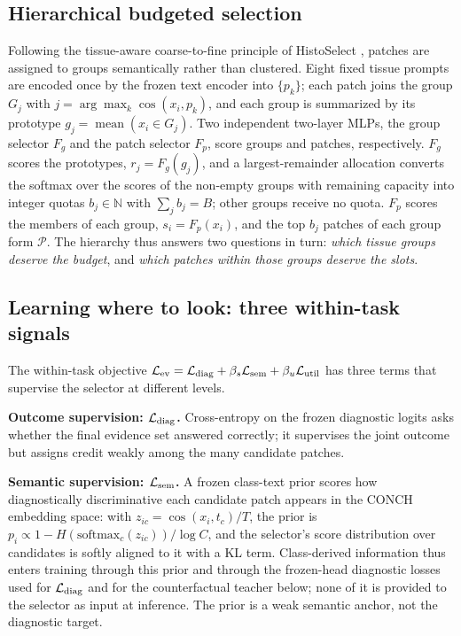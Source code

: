 \documentclass{article}
\def\L{{\cal L}}
\newcommand{\Fg}{F_g}
\newcommand{\Fp}{F_p}
\newcommand{\Psel}{\mathcal{P}}
\begin{document}
\subsection{Hierarchical budgeted selection}
\label{ssec:hier}

Following the tissue-aware coarse-to-fine principle of HistoSelect \cite{huang2026histoselect}, patches are assigned to groups semantically rather than clustered. Eight fixed tissue prompts are encoded once by the frozen text encoder into $\{p_k\}$; each patch joins the group $G_j$ with $j=\arg\max_k\cos(x_i,p_k)$, and each group is summarized by its prototype $g_j=\operatorname{mean}(x_i\in G_j)$. Two independent two-layer MLPs, the group selector $\Fg$ and the patch selector $\Fp$, score groups and patches, respectively. $\Fg$ scores the prototypes, $r_j=\Fg(g_j)$, and a largest-remainder allocation converts the softmax over the scores of the non-empty groups with remaining capacity into integer quotas $b_j\in\mathbb{N}$ with $\sum_j b_j=B$; other groups receive no quota. $\Fp$ scores the members of each group, $s_i=\Fp(x_i)$, and the top $b_j$ patches of each group form $\Psel$. The hierarchy thus answers two questions in turn: \emph{which tissue groups deserve the budget}, and \emph{which patches within those groups deserve the slots}.

\subsection{Learning where to look: three within-task signals}
\label{ssec:within}

The within-task objective $\L_{\mathrm{ev}}=\L_{\mathrm{diag}}+\beta_s\L_{\mathrm{sem}}+\beta_u\L_{\mathrm{util}}$ has three terms that supervise the selector at different levels.

\textbf{Outcome supervision: $\L_{\mathrm{diag}}$.}
Cross-entropy on the frozen diagnostic logits asks whether the final evidence set answered correctly; it supervises the joint outcome but assigns credit weakly among the many candidate patches.

\textbf{Semantic supervision: $\L_{\mathrm{sem}}$.}
A frozen class-text prior scores how diagnostically discriminative each candidate patch appears in the CONCH embedding space: with $z_{ic}=\cos(x_i,t_c)/T$, the prior is $p_i\propto 1-H(\mathrm{softmax}_c(z_{ic}))/\log C$, and the selector's score distribution over candidates is softly aligned to it with a KL term. Class-derived information thus enters training through this prior and through the frozen-head diagnostic losses used for $\L_{\rm diag}$ and for the counterfactual teacher below; none of it is provided to the selector as input at inference. The prior is a weak semantic anchor, not the diagnostic target.
\end{document}
